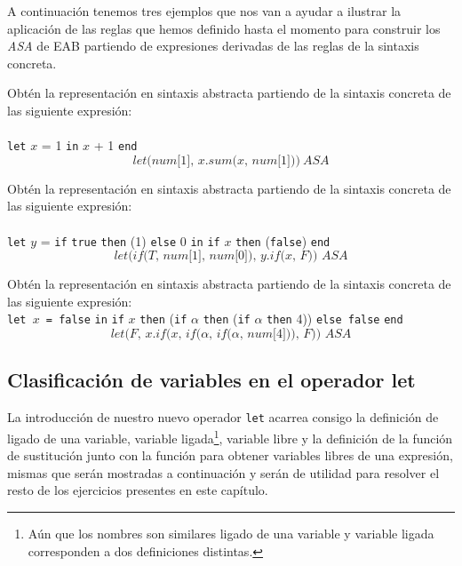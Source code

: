     A continuación tenemos tres ejemplos que nos van a ayudar a ilustrar la aplicación de las reglas que hemos definido hasta el momento para construir los \textit{ASA} de \textsf{EAB} partiendo de expresiones derivadas de las reglas de la sintaxis concreta.

    \begin{exercise}
        Obtén la representación en sintaxis abstracta partiendo de la sintaxis concreta de las siguiente expresión: \\\\
        \texttt{let} $x$ = 1 \texttt{in} $x$ + 1 \texttt{end}\\
        \[
            \textit{let(num[1], $x$.sum($x$, num[1]))}\ ASA
        \]
    \end{exercise}

    \begin{exercise}
        Obtén la representación en sintaxis abstracta partiendo de la sintaxis concreta de las siguiente expresión: \\\\
        \texttt{let} $y$ = \texttt{if} \texttt{true} \texttt{then} (1) \texttt{else} 0 \texttt{in} \texttt{if} $x$ \texttt{then} (\texttt{false}) \texttt{end}\\
        \[
            \textit{let(if(T, num[1], num[0]), $y$.if($x$, F))\ ASA}
        \]
    \end{exercise}

    \begin{exercise}
        Obtén la representación en sintaxis abstracta partiendo de la sintaxis concreta de las siguiente expresión: \\
        
        \texttt{let $x$ = false} \texttt{in} \texttt{if} $x$ \texttt{then} (\texttt{if} $\alpha$ \texttt{then} (\texttt{if} $\alpha$ \texttt{then} 4)) \texttt{else false} \texttt{end}\\
        \[
            \textit{let(F, x.if(x, if($\alpha$, if($\alpha$, num[4])), F)) ASA}
        \]        
    \end{exercise}

  

    \subsection{Clasificación de variables en el operador let}
    
    La introducción de nuestro nuevo operador \texttt{let} acarrea consigo la definición de ligado de una variable, variable ligada\footnote{Aún que los nombres son similares ligado de una variable y variable ligada corresponden a dos definiciones distintas.}, variable libre y la definición de la función de sustitución junto con la función para obtener variables libres de una expresión, mismas que serán mostradas a continuación y serán de utilidad para resolver el resto de los ejercicios presentes en este capítulo.\\
    
